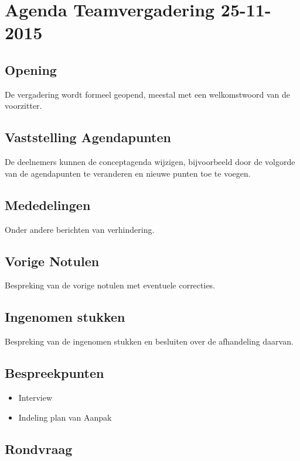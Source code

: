 \documentclass[dutch]{hu}
\subtitle{Agenda Teamvergadering \vergaderingDatum}
\def \vergaderingDatum{25-11-2015}
\begin{document}
\maketitle
\chapter{Agenda Teamvergadering \vergaderingDatum}
\section{Opening}
De vergadering wordt formeel geopend, meestal met een welkomstwoord van de voorzitter.

\section{Vaststelling Agendapunten}
De deelnemers kunnen de conceptagenda wijzigen, bijvoorbeeld door de volgorde van de agendapunten te veranderen en nieuwe punten toe te voegen.

\section{Mededelingen}
Onder andere berichten van verhindering.

\section{Vorige Notulen}
Bespreking van de vorige notulen met eventuele correcties.

\section{Ingenomen stukken}
Bespreking van de ingenomen stukken en besluiten over de afhandeling daarvan.

\section{Bespreekpunten}
\begin{itemize}
\item Interview
\item Indeling plan van Aanpak
\end{itemize}

\section{Rondvraag}
\end{document}
